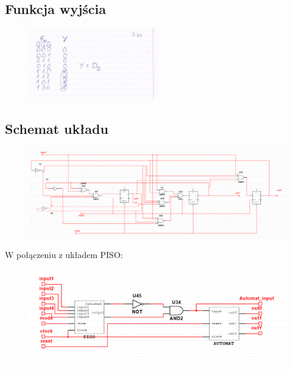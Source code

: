 \documentclass{article}
\begin{document}
\subsection{Funkcja wyjścia}
\begin{figure}[H]
\includegraphics[width = 0.5\textwidth]{3b_wyjscia}
\end{figure}
\subsection{Schemat układu}
\begin{figure}[H]
\includegraphics[width = \textwidth]{3b_uklad}
\end{figure}
W połączeniu z układem PISO:
\begin{figure}[H]
\includegraphics[width = \textwidth]{3b_uklad_z_2b_blackbox}
\end{figure}
\end{document}
